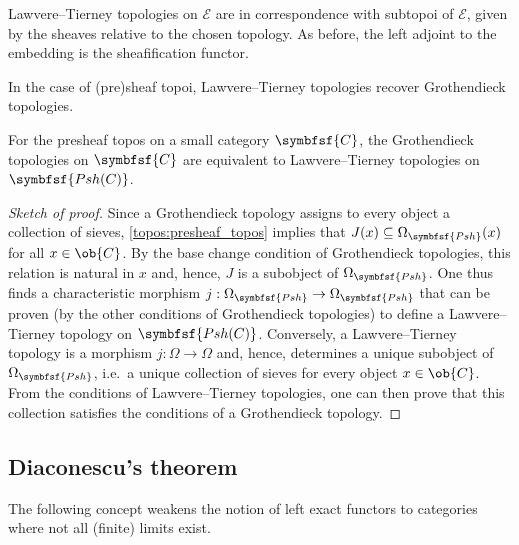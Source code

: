     \begin{property}
        Lawvere--Tierney topologies on $\mathcal{E}$ are in correspondence with subtopoi of $\mathcal{E}$, given by the sheaves relative to the chosen topology. As before, the left adjoint to the embedding is the sheafification functor.
    \end{property}

    In the case of (pre)sheaf topoi, Lawvere--Tierney topologies recover Grothendieck topologies.
    \begin{result}
        For the presheaf topos on a small category $\symbfsf{C}$, the Grothendieck topologies on $\symbfsf{C}$ are equivalent to Lawvere--Tierney topologies on $\symbfsf{Psh(C)}$.
        \begin{mdframed}[roundcorner=10pt, linecolor=blue, linewidth=1pt]
            \begin{proof}[Sketch of proof]
                Since a Grothendieck topology assigns to every object a collection of sieves, \cref{topos:presheaf_topos} implies that $J(x)\subseteq\Omega_{\symbfsf{Psh}}(x)$ for all $x\in\ob{C}$. By the base change condition of Grothendieck topologies, this relation is natural in $x$ and, hence, $J$ is a subobject of $\Omega_{\symbfsf{Psh}}$. One thus finds a characteristic morphism $j:\Omega_{\symbfsf{Psh}}\rightarrow\Omega_{\symbfsf{Psh}}$ that can be proven (by the other conditions of Grothendieck topologies) to define a Lawvere--Tierney topology on $\symbfsf{Psh(C)}$. Conversely, a Lawvere--Tierney topology is a morphism $j:\Omega\rightarrow\Omega$ and, hence, determines a unique subobject of $\Omega_{\symbfsf{Psh}}$, i.e.~a unique collection of sieves for every object $x\in\ob{C}$. From the conditions of Lawvere--Tierney topologies, one can then prove that this collection satisfies the conditions of a Grothendieck topology.
            \end{proof}
        \end{mdframed}
    \end{result}

\subsection{Diaconescu's theorem}\label{section:diaconescu}

    The following concept weakens the notion of left exact functors to categories where not all (finite) limits exist.

